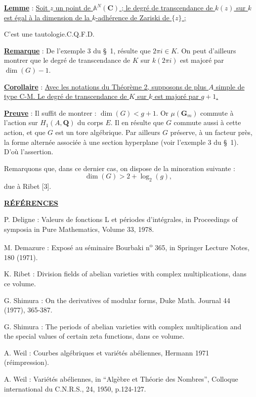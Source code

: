 \documentclass[10pt,a4paper]{article}
\newcommand{\Q}{\mathbf Q}
\newcommand{\C}{\mathbf C}
\newcommand{\Gm}{\mathbf G_m}
\newenvironment{refitems}{\begin{list}{}{\setlength{\leftmargin}{3.2em}\setlength{\labelwidth}{2.7em}\setlength{\labelsep}{0.5em}\setlength{\itemsep}{0.55em}\setlength{\parsep}{0pt}\setlength{\topsep}{0.2em}}}{\end{list}}
\begin{document}
\noindent\uline{\textbf{Lemme}} : \uline{Soit $z$ un point de $\mathbb A^N(\C)$ ; le degré de transcendance de $k(z)$ sur $k$ est égal à la dimension de la $k$-adhérence de Zariski de $\{z\}$ ;}

\begin{center}C'est une tautologie.\hfill C.Q.F.D.\end{center}

\noindent\uline{\textbf{Remarque}} : De l'exemple 3 du \S\ 1, résulte que $2\pi i\in K$. On peut d'ailleurs montrer que le degré de transcendance de $K$ sur $k(2\pi i)$ est majoré par $\dim(G)-1$.

\noindent\uline{\textbf{Corollaire}} : \uline{Avec les notations du Théorème 2, supposons de plus $A$ simple de type C-M. Le degré de transcendance de $K$ sur $k$ est majoré par $g+1$.}

\noindent\uline{\textbf{Preuve}} : Il suffit de montrer : $\dim(G)<g+1$. Or $\mu(\Gm)$ commute à l'action sur $H_1(A,\Q)$ du corps $E$. Il en résulte que $G$ commute aussi à cette action, et que $G$ est un tore algébrique. Par ailleurs $G$ préserve, à un facteur près, la forme alternée associée à une section hyperplane (voir l'exemple 3 du \S\ 1). D'où l'assertion.

Remarquons que, dans ce dernier cas, on dispose de la minoration suivante :
\[
\dim(G)>2+\log_2(g),
\]
due à Ribet [3].


\newpage


\noindent\uline{\textbf{RÉFÉRENCES}}

\begin{refitems}
\item[{[1]}] P. Deligne : Valeurs de fonctions L et périodes d'intégrales, in Proceedings of symposia in Pure Mathematics, Volume 33, 1978.
\item[{[2]}] M. Demazure : Exposé au séminaire Bourbaki n\textsuperscript{o} 365, in Springer Lecture Notes, 180 (1971).
\item[{[3]}] K. Ribet : Division fields of abelian varieties with complex multiplications, dans ce volume.
\item[{[4]}] G. Shimura : On the derivatives of modular forms, Duke Math. Journal 44 (1977), 365-387.
\item[{[5]}] G. Shimura : The periods of abelian varieties with complex multiplication and the special values of certain zeta functions, dans ce volume.
\item[{[6]}] A. Weil : Courbes algébriques et variétés abéliennes, Hermann 1971 (réimpression).
\item[{[7]}] A. Weil : Variétés abéliennes, in ``Algèbre et Théorie des Nombres'', Colloque international du C.N.R.S., 24, 1950, p.124-127.
\end{refitems}
\end{document}
